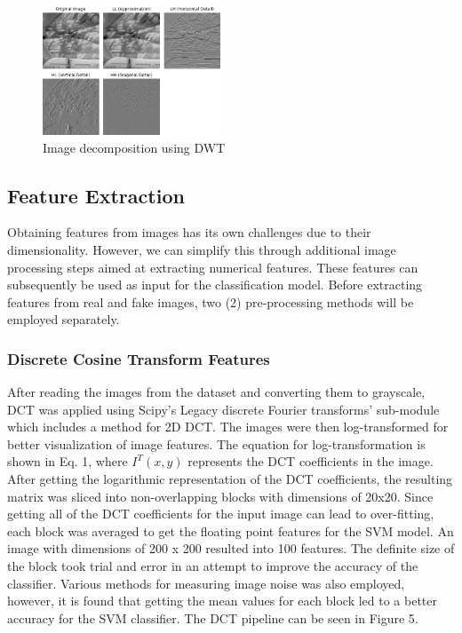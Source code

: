 \documentclass{icsthesis}
\begin{document}
\begin{mainmatter}
\begin{figure}[ht]
    \centering
    \vspace{4ex}
	\includegraphics[width=200px]{imgs/img001002_dwt.png}
    \caption{Image decomposition using DWT}
    \label{fig:enter-label}
\end{figure}

\subsection{Feature Extraction}
Obtaining features from images has its own challenges due to their dimensionality. However, we can simplify this through additional image processing steps aimed at extracting numerical features. These features can subsequently be used as input for the classification model.
Before extracting features from real and fake images, two (2) pre-processing methods will be employed separately.

\subsubsection{Discrete Cosine Transform Features}
After reading the images from the dataset and converting them to grayscale, DCT was applied using Scipy's Legacy discrete Fourier transforms' sub-module which includes a method for 2D DCT. The images were then log-transformed for better visualization of image features. The equation for log-transformation is shown in Eq. 1, where  \(I^T(x,y)\) represents the DCT coefficients in the image. After getting the logarithmic representation of the DCT coefficients, the resulting matrix was sliced into non-overlapping blocks with dimensions of 20x20. Since getting all of the DCT coefficients for the input image can lead to over-fitting, each block was averaged to get the floating point features for the SVM model. An image with dimensions of 200 x 200 resulted into 100 features. The definite size of the block took trial and error in an attempt to improve the accuracy of the classifier. Various methods for measuring image noise was also employed, however, it is found that getting the mean values for each block led to a better accuracy for the SVM classifier. The DCT pipeline can be seen in Figure 5. 


\end{mainmatter}
\end{document}
